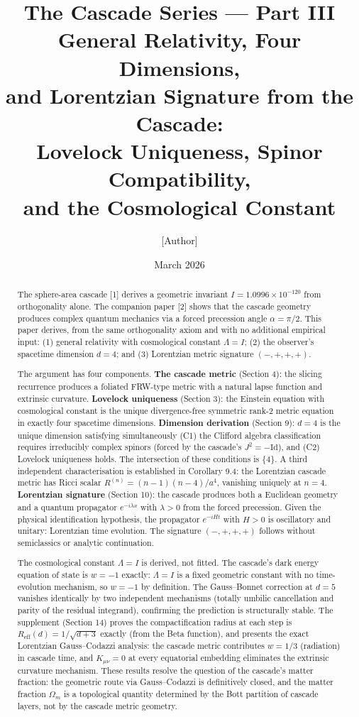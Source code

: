 \documentclass[12pt,a4paper]{article}
\title{\textbf{The Cascade Series --- Part III}\\[6pt]
General Relativity, Four Dimensions,\\
and Lorentzian Signature from the Cascade:\\
Lovelock Uniqueness, Spinor Compatibility,\\
and the Cosmological Constant}
\author{[Author]}
\date{March 2026}
\begin{document}
\maketitle

\begin{abstract}
The sphere-area cascade [1] derives a geometric invariant $I = 1.0996 \times 10^{-120}$
from orthogonality alone. The companion paper [2] shows that the cascade geometry
produces complex quantum mechanics via a forced precession angle $\alpha = \pi/2$. This
paper derives, from the same orthogonality axiom and with no additional empirical
input: (1) general relativity with cosmological constant $\Lambda = I$; (2) the observer's
spacetime dimension $d = 4$; and (3) Lorentzian metric signature $(-,+,+,+)$.

The argument has four components. \textbf{The cascade metric} (Section 4): the slicing
recurrence produces a foliated FRW-type metric with a natural lapse function and
extrinsic curvature. \textbf{Lovelock uniqueness} (Section 3): the Einstein equation with
cosmological constant is the unique divergence-free symmetric rank-2 metric equation
in exactly four spacetime dimensions. \textbf{Dimension derivation} (Section 9): $d = 4$ is the
unique dimension satisfying simultaneously (C1) the Clifford algebra classification
requires irreducibly complex spinors (forced by the cascade's $J^2 = -\text{Id}$), and (C2)
Lovelock uniqueness holds. The intersection of these conditions is $\{4\}$. A third
independent characterisation is established in Corollary 9.4: the Lorentzian cascade
metric has Ricci scalar $R^{(n)} = (n-1)(n-4)/a^4$, vanishing uniquely at $n = 4$.
\textbf{Lorentzian signature} (Section 10): the cascade produces both a Euclidean geometry
and a quantum propagator $e^{-i\lambda x}$ with $\lambda > 0$ from the forced precession. Given the
physical identification hypothesis, the propagator $e^{-iHt}$ with $H > 0$ is oscillatory
and unitary: Lorentzian time evolution. The signature $(-,+,+,+)$ follows without
semiclassics or analytic continuation.

The cosmological constant $\Lambda = I$ is derived, not fitted. The cascade's dark
energy equation of state is $w = -1$ exactly: $\Lambda = I$ is a fixed geometric constant
with no time-evolution mechanism, so $w = -1$ by definition. The Gauss--Bonnet
correction at $d = 5$ vanishes identically by two independent mechanisms (totally
umbilic cancellation and parity of the residual integrand), confirming the prediction is
structurally stable. The supplement (Section 14) proves the compactification radius
at each step is $R_{\text{eff}}(d) = 1/\sqrt{d + 3}$ exactly (from the Beta function), and presents the
exact Lorentzian Gauss--Codazzi analysis: the cascade metric contributes $w = 1/3$
(radiation) in cascade time, and $K_{\mu\nu} = 0$ at every equatorial embedding eliminates
the extrinsic curvature mechanism. These results resolve the question of the cascade's
matter fraction: the geometric route via Gauss--Codazzi is definitively closed, and
the matter fraction $\Omega_m$ is a topological quantity determined by the Bott partition of
cascade layers, not by the cascade metric geometry.
\end{abstract}
\end{document}
